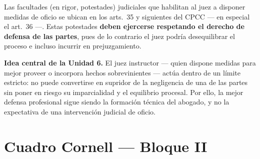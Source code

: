 \documentclass[12pt,oneside]{book}
\begin{document}
Las facultades (en rigor, potestades) judiciales que habilitan al juez a disponer medidas de oficio se ubican en los arts.\ 35 y siguientes del CPCC --- en especial el art.\ 36 ---. Estas potestades \textbf{deben ejercerse respetando el derecho de defensa de las partes}, pues de lo contrario el juez podría desequilibrar el proceso e incluso incurrir en prejuzgamiento.

\begin{important}
\textbf{Idea central de la Unidad 6.} El juez instructor --- quien dispone medidas para mejor proveer o incorpora hechos sobrevinientes --- actúa dentro de un límite estricto: no puede convertirse en supridor de la negligencia de una de las partes sin poner en riesgo su imparcialidad y el equilibrio procesal. Por ello, la mejor defensa profesional sigue siendo la formación técnica del abogado, y no la expectativa de una intervención judicial de oficio.
\end{important}

\section{Cuadro Cornell --- Bloque II}
\end{document}
